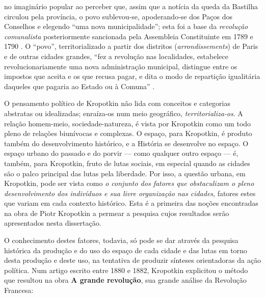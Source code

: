 no imaginário popular ao perceber que, assim que a notícia da queda da Bastilha circulou pela província, o povo sublevou-se, apoderando-se dos Paços dos Conselhos e elegendo  ``uma nova municipalidade''; esta foi a base da \textit{revolução comunalista} posteriormente sancionada pela Assembleia Constituinte em 1789 e 1790 \cite[pp.~121]{KROPOTKIN1955}. O ``povo'', territorializado a partir dos distritos (\textit{arrondissements}) de Paris e de outras cidades grandes, ``fez a revolução nas localidades, estabelece revolucionariamente uma nova administração municipal, distingue entre os impostos que aceita e os que recusa pagar, e dita o modo de repartição igualitária daqueles que pagaria ao Estado ou à Comuna'' \cite[p.~130]{KROPOTKIN1955}.

O pensamento político de Kropotkin não lida com conceitos e categorias abstratas ou idealizadas; enraíza-os num meio geográfico, \textit{territorializa-os}. A relação homem-meio, sociedade-natureza, é vista por Kropotkin como um todo pleno de relações biunívocas e complexas. O espaço, para Kropotkin, é produto também do desenvolvimento histórico, e a História se desenvolve no espaço. O espaço urbano do passado e do porvir --- como qualquer outro espaço --- é, também, para Kropotkin, fruto de lutas sociais, em especial quando as cidades são o palco principal das lutas pela liberdade. Por isso, a questão urbana, em Kropotkin, pode ser vista como \textit{o conjunto dos fatores que obstaculizam o pleno desenvolvimento dos indivíduos e sua livre organização nas cidades}, fatores estes que variam em cada contexto histórico. Esta é a primeira das noções encontradas na obra de Piotr Kropotkin a permear a pesquisa cujos resultados serão apresentados nesta dissertação.

O conhecimento destes fatores, todavia, só pode se dar através da pesquisa histórica da produção e do uso do espaço de cada cidade e das lutas em torno desta produção e deste uso, na tentativa de produzir sínteses orientadoras da ação política. Num artigo escrito entre 1880 e 1882, Kropotkin explicitou o método que resultou na obra \textbf{A grande revolução}, sua grande análise da Revolução Francesa: 

